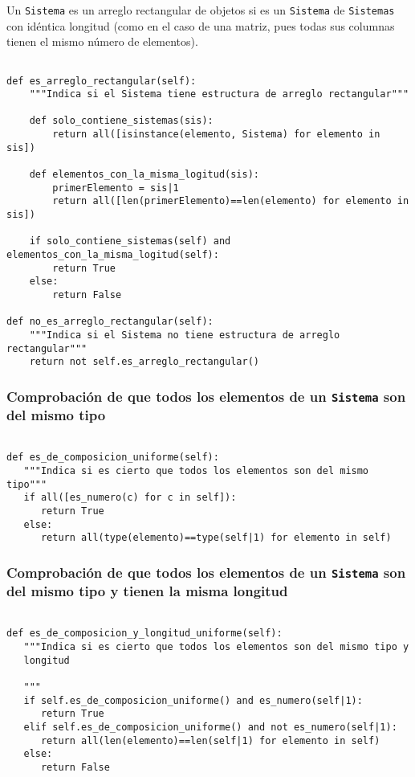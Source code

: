 \documentclass[11pt]{report}
\begin{document}
Un \texttt{Sistema} es un arreglo rectangular de objetos si es un \texttt{Sistema}
de \texttt{Sistemas} con idéntica longitud (como en el caso de una matriz,
pues todas sus columnas tienen el mismo número de elementos).
\begin{verbatim}

def es_arreglo_rectangular(self):
    """Indica si el Sistema tiene estructura de arreglo rectangular"""

    def solo_contiene_sistemas(sis):
        return all([isinstance(elemento, Sistema) for elemento in sis])

    def elementos_con_la_misma_logitud(sis):
        primerElemento = sis|1
        return all([len(primerElemento)==len(elemento) for elemento in sis])

    if solo_contiene_sistemas(self) and elementos_con_la_misma_logitud(self):
        return True
    else:
        return False

def no_es_arreglo_rectangular(self):
    """Indica si el Sistema no tiene estructura de arreglo rectangular"""
    return not self.es_arreglo_rectangular()

\end{verbatim}

\subsubsection{Comprobación de que todos los elementos de un \texttt{Sistema} son del mismo tipo}
\label{sec:org4493bcb}

\begin{verbatim}

def es_de_composicion_uniforme(self):
   """Indica si es cierto que todos los elementos son del mismo tipo"""
   if all([es_numero(c) for c in self]):
      return True
   else:
      return all(type(elemento)==type(self|1) for elemento in self)

\end{verbatim}

\subsubsection{Comprobación de que todos los elementos de un \texttt{Sistema} son del mismo tipo y tienen la misma longitud}
\label{sec:orgcd873ee}

\begin{verbatim}

def es_de_composicion_y_longitud_uniforme(self):
   """Indica si es cierto que todos los elementos son del mismo tipo y
   longitud

   """
   if self.es_de_composicion_uniforme() and es_numero(self|1):
      return True   
   elif self.es_de_composicion_uniforme() and not es_numero(self|1):
      return all(len(elemento)==len(self|1) for elemento in self)
   else:
      return False
   
\end{verbatim}
\end{document}
